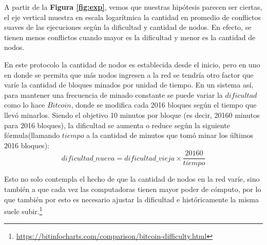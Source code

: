 \documentclass[10pt, a4paper, hidelinks]{article}
\begin{document}
A partir de la \textbf{Figura \ref{fig:exp}}, vemos que nuestras hipótesis parecen ser ciertas, el eje vertical muestra en escala logarítmica la cantidad en promedio de conflictos suaves de las ejecuciones según la dificultad y cantidad de nodos. En efecto, se tienen menos conflictos cuando mayor es la dificultad y menor es la cantidad de nodos.

En este protocolo la cantidad de nodos es establecida desde el inicio, pero en uno en donde se permita que más nodos ingresen a la red se tendría otro factor que varíe la cantidad de bloques minados por unidad de tiempo. En un sistema así, para mantener una frecuencia de minado constante se puede variar la $dificultad$ como lo hace $Bitcoin$, donde se modifica cada 2016 bloques según el tiempo que llevó minarlos. Siendo el objetivo 10 minutos por bloque (es decir, 20160 minutos para 2016 bloques), la dificultad se aumenta o reduce según la siguiente fórmula(llamando $tiempo$ a la cantidad de minutos que tomó minar los últimos 2016 bloques):
\begin{equation*}
dificultad\_nueva = dificultad\_vieja \times \frac{20160}{tiempo}
\end{equation*}

Esto no solo contempla el hecho de que la cantidad de nodos en la red varíe, sino también a que cada vez las computadoras tienen mayor poder de cómputo, por lo que también por esto es necesario ajustar la dificultad e históricamente la misma suele subir.\footnote{\url{https://bitinfocharts.com/comparison/bitcoin-difficulty.html}}




\newpage


\end{document}
